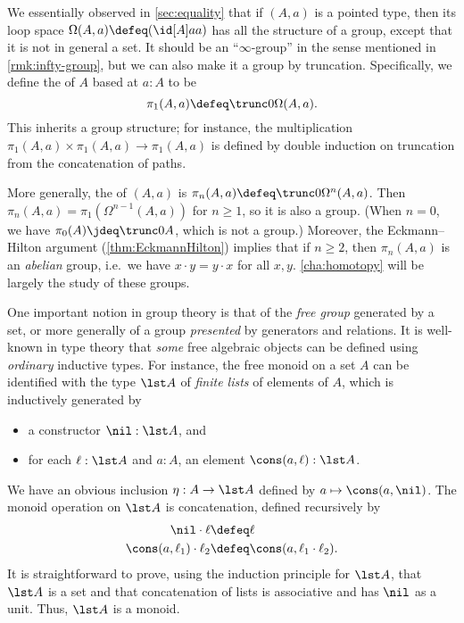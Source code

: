 \begin{eg}\label{thm:homotopy-groups}
  We essentially observed in \cref{sec:equality} that if $(A,a)$ is a pointed type, then its loop space $\Omega(A,a)\defeq (\id[A]aa)$ has all the structure of a group, except that it is not in general a set.
  It should be an ``$\infty$-group'' in the sense mentioned in \cref{rmk:infty-group}, but we can also make it a group by truncation.
  Specifically, we define the 
  of $A$ based at $a:A$ to be
  \[\pi_1(A,a)\defeq \trunc0{\Omega(A,a)}.\]
  This inherits a group structure; for instance, the multiplication $\pi_1(A,a) \times \pi_1(A,a) \to \pi_1(A,a)$ is defined by double induction on truncation from the concatenation of paths.

  More generally, the 
  of $(A,a)$ is $\pi_n(A,a)\defeq \trunc0{\Omega^n(A,a)}$.
  Then $\pi_n(A,a) = \pi_1(\Omega^{n-1}(A,a))$ for $n\ge 1$, so it is also a group.
  (When $n=0$, we have $\pi_0(A) \jdeq \trunc0 A$, which is not a group.)
  Moreover, the Eckmann--Hilton argument  (\cref{thm:EckmannHilton}) implies that if $n\ge 2$, then $\pi_n(A,a)$ is an \emph{abelian} group, i.e.\ we have $x\cdot y = y\cdot x$ for all $x,y$.
  \cref{cha:homotopy} will be largely the study of these groups.
\end{eg}

%
%
One important notion in group theory is that of the \emph{free group} generated by a set, or more generally of a group \emph{presented} by generators and relations.
It is well-known in type theory that \emph{some} free algebraic objects can be defined using \emph{ordinary} inductive types.
%
%
%
%
For instance, the free monoid on a set $A$ can be identified with the type $\lst A$ of \emph{finite lists}  of elements of $A$, which is inductively generated by
\begin{itemize}
\item a constructor $\nil:\lst A$, and
\item for each $\ell:\lst A$ and $a:A$, an element $\cons(a,\ell):\lst A$.
\end{itemize}
We have an obvious inclusion $\eta : A\to \lst A$ defined by $a\mapsto \cons(a,\nil)$.
The monoid operation on $\lst A$ is concatenation, defined recursively by
\begin{align*}
  \nil \cdot \ell &\defeq \ell\\
  \cons (a,\ell_1) \cdot \ell_2 &\defeq \cons(a, \ell_1\cdot\ell_2).
\end{align*}
It is straightforward to prove, using the induction principle for $\lst A$, that $\lst A$ is a set and that concatenation of lists is associative
%
and has $\nil$ as a unit.
Thus, $\lst A$ is a monoid.

